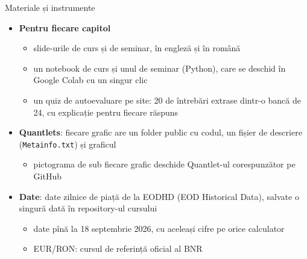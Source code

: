 \begin{frame}{Materiale și instrumente}
\itemsize{\small}
\begin{itemize}
    \item \textbf{Pentru fiecare capitol}
    \begin{itemize}
        \item slide-urile de curs și de seminar, în engleză și în română
        \item un notebook de curs și unul de seminar (Python), care se deschid în Google Colab cu un singur clic
        \item un quiz de autoevaluare pe site: 20 de întrebări extrase dintr-o bancă de 24, cu explicație pentru fiecare răspuns
    \end{itemize}
    \item \textbf{Quantlets}: fiecare grafic are un folder public cu codul, un fișier de descriere (\texttt{Metainfo.txt}) și graficul
    \begin{itemize}
        \item pictograma de sub fiecare grafic deschide Quantlet-ul corespunzător pe GitHub
    \end{itemize}
    \item \hypertarget{ch0-materials}{}\textbf{Date}: date zilnice de piață de la EODHD (EOD Historical Data), salvate o singură dată în repository-ul cursului
    \begin{itemize}
        \item date pînă la 18 septembrie 2026, cu aceleași cifre pe orice calculator
        \item EUR/RON: cursul de referință oficial al BNR
    \end{itemize}
\end{itemize}
\end{frame}

